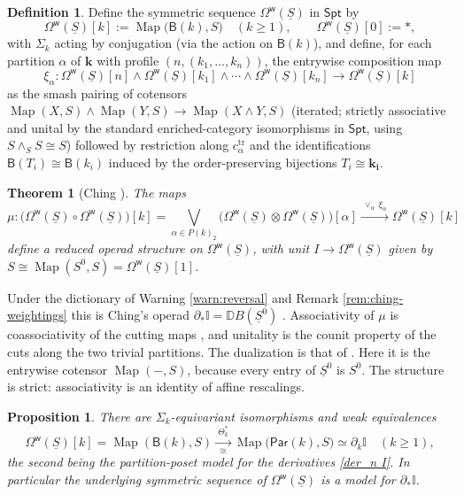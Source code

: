 \documentclass[12pt]{amsart}
\newtheorem{theorem}[subsection]{Theorem}
\newtheorem{proposition}[subsection]{Proposition}
\theoremstyle{definition}
\newtheorem{definition}[subsection]{Definition}
\theoremstyle{remark}
\newcommand{\Spt}{\mathsf{Spt}}
\newcommand{\Map}{\operatorname{Map}}
\newcommand{\Id}{\mathbb{I}}
\newcommand{\pt}{*}
\newcommand{\uS}{\underline{S}}
\newcommand{\Par}{\mathsf{Par}}
\newcommand{\uSz}{\uS^{0}}                       %
\newcommand{\BC}{\mathsf{B}}                     %
\newcommand{\Omw}{\Omega^{\mathsf{w}}}           %
\newcommand{\Thet}{\Theta}                       %
\begin{document}
\begin{definition}\label{def:omw}
Define the symmetric sequence $\Omw(\uS)$ in $\Spt$ by
\[ \Omw(\uS)[k] := \Map\big( \BC(k), S\big) \quad (k\geq 1), \quad\quad \Omw(\uS)[0] := \pt,\]
with $\Sigma_k$ acting by conjugation (via the action on $\BC(k)$), and define, for each partition $\alpha$ of $\mathbf{k}$ with profile $(n, (k_1,\dots,k_n))$, the entrywise composition map
\[ \xi_\alpha \colon \Omw(\uS)[n]\wedge \Omw(\uS)[k_1]\wedge \cdots \wedge \Omw(\uS)[k_n] \longrightarrow \Omw(\uS)[k]\]
as the smash pairing of cotensors $\Map(X, S)\wedge \Map(Y,S)\to \Map(X\wedge Y, S)$ (iterated; strictly associative and unital by the standard enriched-category isomorphisms in $\Spt$, using $S\wedge_S S\cong S$) followed by restriction along $c^{\mathrm{tr}}_\alpha$ and the identifications $\BC(T_i)\cong \BC(k_i)$ induced by the order-preserving bijections $T_i\cong \mathbf{k_i}$.
\end{definition}

\begin{theorem}[{Ching \cite[\S\S 4--6, \S 8]{Ching-thesis}}]\label{thm:omw-operad}
The maps
\[ \mu\colon \big(\Omw(\uS)\circ \Omw(\uS)\big)[k] = \bigvee_{\alpha\in P(k)_2} \big(\Omw(\uS)\otimes \Omw(\uS)\big)[\alpha] \xrightarrow{\ \vee_\alpha\, \xi_\alpha\ } \Omw(\uS)[k]\]
define a reduced operad structure on $\Omw(\uS)$, with unit $I\to \Omw(\uS)$ given by $S \cong \Map(S^0,S) = \Omw(\uS)[1]$.
\end{theorem}

Under the dictionary of Warning \ref{warn:reversal} and Remark \ref{rem:ching-weightings} this is Ching's operad $\partial_*\Id = \mathbb{D}B(\uSz)$ \cite[Corollary 8.8, Remark 8.9]{Ching-thesis}. Associativity of $\mu$ is coassociativity of the cutting maps \cite[Lemma 4.28, Theorem 4.29]{Ching-thesis}, and unitality is the counit property of the cuts along the two trivial partitions. The dualization is that of \cite[Corollary 5.3, Lemma 6.1, Proposition 6.4]{Ching-thesis}. Here it is the entrywise cotensor $\Map(-,S)$, because every entry of $\uSz$ is $S^0$. The structure is strict: associativity is an identity of affine rescalings.

\begin{proposition}\label{prop:omw-is-derivatives}
There are $\Sigma_k$-equivariant isomorphisms and weak equivalences
\[ \Omw(\uS)[k] = \Map(\BC(k), S) \xrightarrow[\cong]{\ \Thet_k^{*}\ } \Map\big(\Par(k), S\big) \simeq \partial_k \Id \quad (k \geq 1),\]
the second being the partition-poset model for the derivatives \eqref{der_n I}. In particular the underlying symmetric sequence of $\Omw(\uS)$ is a model for $\partial_*\Id$.
\end{proposition}
\end{document}
